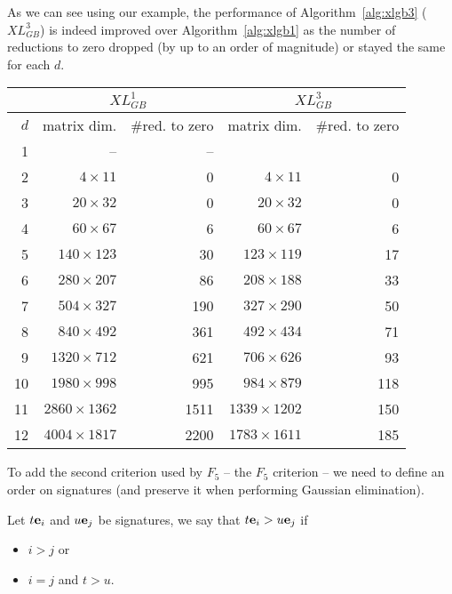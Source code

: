 As we can see using our example, the performance of Algorithm~\ref{alg:xlgb3} ($XL_{GB}^3$) is indeed improved over Algorithm~\ref{alg:xlgb1} as the number of reductions to zero dropped (by up to an order of magnitude) or stayed the same for each $d$.

\begin{center}
\begin{tabular}{|r|r|r|r|r|}
\hline
& \multicolumn{2}{|c|}{$XL_{GB}^1$} & \multicolumn{2}{|c|}{$XL_{GB}^3$}\\
\hline
$d$ & matrix dim. & \#red. to zero & matrix dim. & \#red. to zero\\
\hline
 1&               --&  --&                  &\\
 2&$   4\times   11$&   0& $   4\times   11$&   0\\
 3&$  20\times   32$&   0& $  20\times   32$&   0\\
 4&$  60\times   67$&   6& $  60\times   67$&   6\\
 5&$ 140\times  123$&  30& $ 123\times  119$&  17\\
 6&$ 280\times  207$&  86& $ 208\times  188$&  33\\
 7&$ 504\times  327$& 190& $ 327\times  290$&  50\\
 8&$ 840\times  492$& 361& $ 492\times  434$&  71\\
 9&$1320\times  712$& 621& $ 706\times  626$&  93\\
10&$1980\times  998$& 995& $ 984\times  879$& 118\\
11&$2860\times 1362$&1511& $1339\times 1202$& 150\\
12&$4004\times 1817$&2200& $1783\times 1611$& 185\\
\hline
\end{tabular}
\end{center}

To add the second criterion used by $F_5$ -- the $F_5$ criterion -- we need to define an order on signatures (and preserve it when performing Gaussian elimination). 

\begin{definition}
\label{def:sigorder}
Let $t\mathbf{e}_i$ and $u\mathbf{e}_j$ be signatures, we say that $t\mathbf{e}_i > u\mathbf{e}_j$ if
\begin{itemize}
 \item $i > j$ or
 \item $i = j$ and $t > u$.
\end{itemize}
\end{definition}

